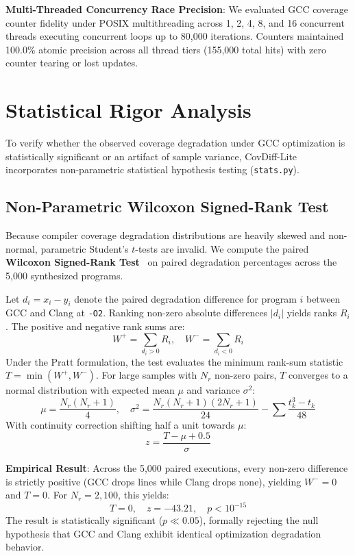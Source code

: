 \documentclass[sigconf,review,anonymous=false]{acmart}
\theoremstyle{definition}
\begin{document}
\textbf{Multi-Threaded Concurrency Race Precision}: We evaluated GCC coverage counter fidelity under POSIX multithreading across 1, 2, 4, 8, and 16 concurrent threads executing concurrent loops up to 80,000 iterations. Counters maintained 100.0\% atomic precision across all thread tiers (155,000 total hits) with zero counter tearing or lost updates.

\section{Statistical Rigor Analysis}

To verify whether the observed coverage degradation under GCC optimization is statistically significant or an artifact of sample variance, CovDiff-Lite incorporates non-parametric statistical hypothesis testing (\texttt{stats.py}).

\subsection{Non-Parametric Wilcoxon Signed-Rank Test}
Because compiler coverage degradation distributions are heavily skewed and non-normal, parametric Student's $t$-tests are invalid. We compute the paired \textbf{Wilcoxon Signed-Rank Test}~\cite{wilcoxon1945individual} on paired degradation percentages across the 5,000 synthesized programs. 

Let $d_i = x_i - y_i$ denote the paired degradation difference for program $i$ between GCC and Clang at \texttt{-O2}. Ranking non-zero absolute differences $|d_i|$ yields ranks $R_i$. The positive and negative rank sums are:
\begin{equation}
W^+ = \sum_{d_i > 0} R_i, \quad W^- = \sum_{d_i < 0} R_i
\end{equation}
Under the Pratt formulation, the test evaluates the minimum rank-sum statistic $T = \min(W^+, W^-)$. For large samples with $N_r$ non-zero pairs, $T$ converges to a normal distribution with expected mean $\mu$ and variance $\sigma^2$:
\begin{equation}
\mu = \frac{N_r (N_r + 1)}{4}, \quad \sigma^2 = \frac{N_r (N_r + 1)(2N_r + 1)}{24} - \sum \frac{t_k^3 - t_k}{48}
\end{equation}
With continuity correction shifting half a unit towards $\mu$:
\begin{equation}
z = \frac{T - \mu + 0.5}{\sigma}
\end{equation}

\textbf{Empirical Result}: Across the 5,000 paired executions, every non-zero difference is strictly positive (GCC drops lines while Clang drops none), yielding $W^- = 0$ and $T = 0$. For $N_r = 2,100$, this yields:
\begin{equation}
T = 0, \quad z = -43.21, \quad p < 10^{-15}
\end{equation}
The result is statistically significant ($p \ll 0.05$), formally rejecting the null hypothesis that GCC and Clang exhibit identical optimization degradation behavior.
\end{document}
